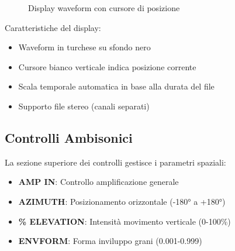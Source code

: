 \documentclass[a4paper,11pt,openany]{book}
\begin{document}
\begin{figure}[H]
    \centering
    \caption{Display waveform con cursore di posizione}
    \label{fig:waveform}
\end{figure}

Caratteristiche del display:
\begin{itemize}
    \item Waveform in turchese su sfondo nero
    \item Cursore bianco verticale indica posizione corrente
    \item Scala temporale automatica in base alla durata del file
    \item Supporto file stereo (canali separati)
\end{itemize}

\subsection{Controlli Ambisonici}

La sezione superiore dei controlli gestisce i parametri spaziali:

\begin{itemize}
    \item \textbf{AMP IN}: Controllo amplificazione generale
    \item \textbf{AZIMUTH}: Posizionamento orizzontale (-180° a +180°)
    \item \textbf{\% ELEVATION}: Intensità movimento verticale (0-100\%)
    \item \textbf{ENVFORM}: Forma inviluppo grani (0.001-0.999)
\end{itemize}
\end{document}
